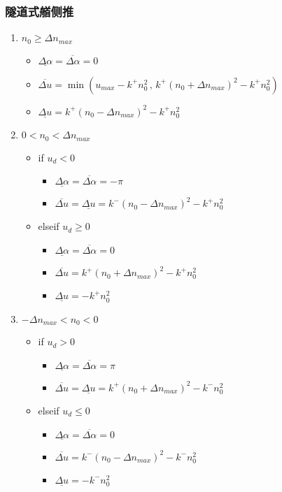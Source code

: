 \subsubsection{隧道式艏侧推}
\begin{enumerate}
  \item $n_0 \geq \Delta n_{max}$
  \begin{itemize}
    \item $\underline{\Delta \alpha} = \overline{\Delta \alpha} = 0$
    \item $\overline{\Delta u}= \min \left( u_{max}-k^+ n_0^2 \, , \,
    k^+ (n_0+ \Delta n_{max})^2 - k^+ n_0^2 \right)$
    \item $\underline{\Delta u}=k^+ (n_0 - \Delta n_{max})^2 - k^+ n_0^2 $
  \end{itemize}

  \item $0 < n_0 < \Delta n_{max}$
  \begin{itemize}
    \item if $u_d < 0$
    \begin{itemize}
      \item $\underline{\Delta \alpha} = \overline{\Delta \alpha} = -\pi$
      \item $\overline{\Delta u}= \underline{\Delta u}=
      k^- (n_0 - \Delta n_{max})^2 - k^+ n_0^2$
    \end{itemize}
    \item elseif $u_d \geq 0$
    \begin{itemize}
      \item $\underline{\Delta \alpha} = \overline{\Delta \alpha} = 0$
      \item $\overline{\Delta u}= k^+ (n_0 + \Delta n_{max})^2 - k^+ n_0^2$
      \item $\underline{\Delta u}=- k^+ n_0^2$
    \end{itemize}
  \end{itemize}

  \item $-\Delta n_{max} < n_0 < 0$
  \begin{itemize}
    \item if $u_d > 0$
    \begin{itemize}
      \item $\underline{\Delta \alpha} = \overline{\Delta \alpha} = \pi$
      \item $\overline{\Delta u}=\underline{\Delta u}=  k^+ (n_0 + \Delta n_{max})^2 - k^- n_0^2$
    \end{itemize}
    \item elseif $u_d \leq 0$
    \begin{itemize}
      \item $\underline{\Delta \alpha} = \overline{\Delta \alpha} = 0$
      \item $\overline{\Delta u}= k^- (n_0 - \Delta n_{max})^2 - k^- n_0^2$
      \item $\underline{\Delta u}=- k^- n_0^2$
    \end{itemize}
  \end{itemize}


\end{enumerate}
